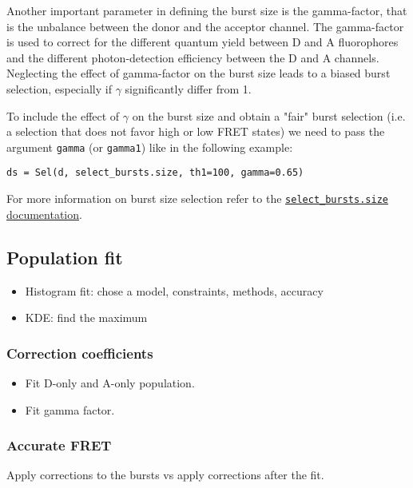 Another important parameter in defining the burst size is the gamma-factor, that is the unbalance between the donor and the acceptor channel. The gamma-factor is used to correct for the different quantum yield between D and A fluorophores and the different photon-detection efficiency between the D and A channels. Neglecting the effect of gamma-factor on the burst size leads to a biased burst selection, especially if $\gamma$ significantly differ from 1. 

To include the effect of $\gamma$ on the burst size and obtain a "fair" burst selection (i.e. a selection that does not favor high or low FRET states) we
need to pass the argument \verb|gamma| (or \verb|gamma1|) like in the following example:

\begin{verbatim}
ds = Sel(d, select_bursts.size, th1=100, gamma=0.65)
\end{verbatim}

For more information on burst size selection refer to the \href{http://fretbursts.readthedocs.org/en/latest/burst_selection.html#fretbursts.select_bursts.size}{\verb|select_bursts.size| documentation}.

\subsection{Population fit}

\begin{itemize}
\item Histogram fit: chose a model, constraints, methods, accuracy
\item KDE: find the maximum
\end{itemize}

\subsubsection{Correction coefficients}

\begin{itemize}
\item Fit D-only and A-only population.
\item Fit gamma factor.
\end{itemize}


\subsubsection{Accurate FRET}

Apply corrections to the bursts vs apply corrections after the fit.

